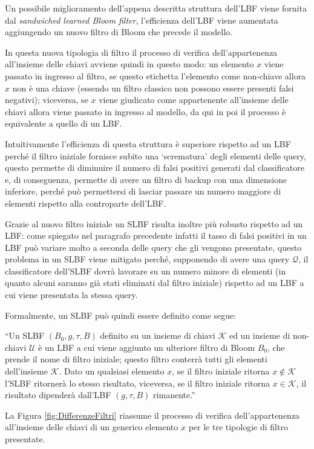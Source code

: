 \documentclass[../../main.tex]{subfiles}
\begin{document}
    Un possibile miglioramento dell'appena descritta struttura dell'LBF viene fornita dal \textit{sandwiched learned Bloom filter}, l'efficienza dell'LBF viene aumentata aggiungendo un nuovo filtro di Bloom che precede il modello.

    In questa nuova tipologia di filtro il processo di verifica dell'appartenenza all'insieme delle chiavi avviene quindi in questo modo: un elemento $x$ viene passato in ingresso al filtro, se questo etichetta l'elemento come non-chiave allora $x$ non è una chiave (essendo un filtro classico non possono essere presenti falsi negativi); viceversa, se $x$ viene giudicato come appartenente all'insieme delle chiavi allora viene passato in ingresso al modello, da qui in poi il processo è equivalente a quello di un LBF.

    Intuitivamente l'efficienza di questa struttura è superiore rispetto ad un LBF perché il filtro iniziale fornisce subito una `scrematura' degli elementi delle query, questo permette di diminuire il numero di falsi positivi generati dal classificatore e, di conseguenza, permette di avere un filtro di backup con una dimensione inferiore, perché può permettersi di lasciar passare un numero maggiore di elementi rispetto alla controparte dell'LBF.

    Grazie al nuovo filtro iniziale un SLBF risulta inoltre più robusto rispetto ad un LBF: come spiegato nel paragrafo precedente infatti il tasso di falsi positivi in un LBF può variare molto a seconda delle query che gli vengono presentate, questo problema in un SLBF viene mitigato perché, supponendo di avere una query $\mathcal{Q}$, il classificatore dell'SLBF dovrà lavorare su un numero minore di elementi (in quanto alcuni saranno già stati eliminati dal filtro iniziale) rispetto ad un LBF a cui viene presentata la stessa query.

    Formalmente, un SLBF può quindi essere definito come segue: 

    ``Un SLBF $(B_0, g, \tau, B)$ definito su un insieme di chiavi $\mathcal{K}$ ed un insieme di non-chiavi $\mathcal{U}$ è un LBF a cui viene aggiunto un ulteriore filtro di Bloom $B_0$, che prende il nome di filtro iniziale; questo filtro conterrà tutti gli elementi dell'insieme $\mathcal{K}$. Dato un qualsiasi elemento $x$, se il filtro iniziale ritorna $x \notin \mathcal{K}$ l'SLBF ritornerà lo stesso risultato, viceversa, se il filtro iniziale ritorna $x \in \mathcal{K}$, il risultato dipenderà dall'LBF $(g, \tau, B)$ rimanente.''

    La Figura \ref{fig:DifferenzeFiltri} riassume il processo di verifica dell'appartenenza all'insieme delle chiavi di un generico elemento $x$ per le tre tipologie di filtro presentate.
    
\end{document}
